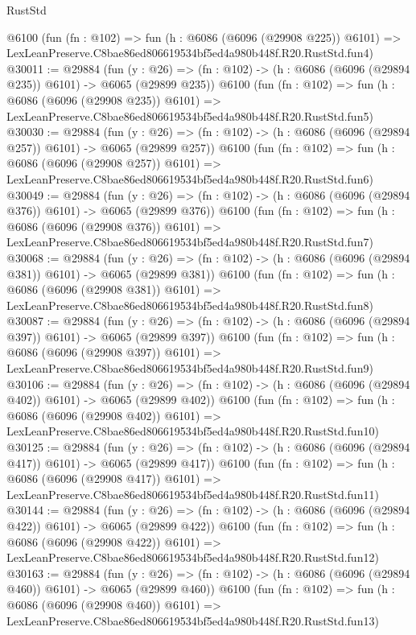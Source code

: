 \begin{lexlean}{RustStd}
\begin{coremodule}
    @6100
    (fun (fn : @102) =>
    fun (h : @6086 (@6096 (@29908 @225)) @6101) =>
    LexLeanPreserve.C8bae86ed806619534bf5ed4a980b448f.R20.RustStd.fun4)
@30011 := @29884
    (fun (y : @26) => (fn : @102) -> (h : @6086 (@6096 (@29894 @235)) @6101) -> @6065 (@29899 @235))
    @6100
    (fun (fn : @102) =>
    fun (h : @6086 (@6096 (@29908 @235)) @6101) =>
    LexLeanPreserve.C8bae86ed806619534bf5ed4a980b448f.R20.RustStd.fun5)
@30030 := @29884
    (fun (y : @26) => (fn : @102) -> (h : @6086 (@6096 (@29894 @257)) @6101) -> @6065 (@29899 @257))
    @6100
    (fun (fn : @102) =>
    fun (h : @6086 (@6096 (@29908 @257)) @6101) =>
    LexLeanPreserve.C8bae86ed806619534bf5ed4a980b448f.R20.RustStd.fun6)
@30049 := @29884
    (fun (y : @26) => (fn : @102) -> (h : @6086 (@6096 (@29894 @376)) @6101) -> @6065 (@29899 @376))
    @6100
    (fun (fn : @102) =>
    fun (h : @6086 (@6096 (@29908 @376)) @6101) =>
    LexLeanPreserve.C8bae86ed806619534bf5ed4a980b448f.R20.RustStd.fun7)
@30068 := @29884
    (fun (y : @26) => (fn : @102) -> (h : @6086 (@6096 (@29894 @381)) @6101) -> @6065 (@29899 @381))
    @6100
    (fun (fn : @102) =>
    fun (h : @6086 (@6096 (@29908 @381)) @6101) =>
    LexLeanPreserve.C8bae86ed806619534bf5ed4a980b448f.R20.RustStd.fun8)
@30087 := @29884
    (fun (y : @26) => (fn : @102) -> (h : @6086 (@6096 (@29894 @397)) @6101) -> @6065 (@29899 @397))
    @6100
    (fun (fn : @102) =>
    fun (h : @6086 (@6096 (@29908 @397)) @6101) =>
    LexLeanPreserve.C8bae86ed806619534bf5ed4a980b448f.R20.RustStd.fun9)
@30106 := @29884
    (fun (y : @26) => (fn : @102) -> (h : @6086 (@6096 (@29894 @402)) @6101) -> @6065 (@29899 @402))
    @6100
    (fun (fn : @102) =>
    fun (h : @6086 (@6096 (@29908 @402)) @6101) =>
    LexLeanPreserve.C8bae86ed806619534bf5ed4a980b448f.R20.RustStd.fun10)
@30125 := @29884
    (fun (y : @26) => (fn : @102) -> (h : @6086 (@6096 (@29894 @417)) @6101) -> @6065 (@29899 @417))
    @6100
    (fun (fn : @102) =>
    fun (h : @6086 (@6096 (@29908 @417)) @6101) =>
    LexLeanPreserve.C8bae86ed806619534bf5ed4a980b448f.R20.RustStd.fun11)
@30144 := @29884
    (fun (y : @26) => (fn : @102) -> (h : @6086 (@6096 (@29894 @422)) @6101) -> @6065 (@29899 @422))
    @6100
    (fun (fn : @102) =>
    fun (h : @6086 (@6096 (@29908 @422)) @6101) =>
    LexLeanPreserve.C8bae86ed806619534bf5ed4a980b448f.R20.RustStd.fun12)
@30163 := @29884
    (fun (y : @26) => (fn : @102) -> (h : @6086 (@6096 (@29894 @460)) @6101) -> @6065 (@29899 @460))
    @6100
    (fun (fn : @102) =>
    fun (h : @6086 (@6096 (@29908 @460)) @6101) =>
    LexLeanPreserve.C8bae86ed806619534bf5ed4a980b448f.R20.RustStd.fun13)

\end{coremodule}
\end{lexlean}
